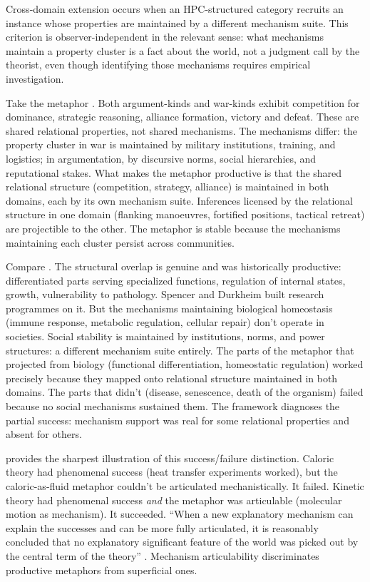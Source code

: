 \documentclass[12pt]{article}
\begin{document}
Cross-domain extension occurs when an HPC-structured category recruits an instance whose properties are maintained by a different mechanism suite. This criterion is observer-independent in the relevant sense: what mechanisms maintain a property cluster is a fact about the world, not a judgment call by the theorist, even though identifying those mechanisms requires empirical investigation.

Take the metaphor . Both argument-kinds and war-kinds exhibit competition for dominance, strategic reasoning, alliance formation, victory and defeat. These are shared relational properties, not shared mechanisms. The mechanisms differ: the property cluster in war is maintained by military institutions, training, and logistics; in argumentation, by discursive norms, social hierarchies, and reputational stakes. What makes the metaphor productive is that the shared relational structure (competition, strategy, alliance) is maintained in both domains, each by its own mechanism suite. Inferences licensed by the relational structure in one domain (flanking manoeuvres, fortified positions, tactical retreat) are projectible to the other. The metaphor is stable because the mechanisms maintaining each cluster persist across communities.

Compare . The structural overlap is genuine and was historically productive: differentiated parts serving specialized functions, regulation of internal states, growth, vulnerability to pathology. Spencer and Durkheim built research programmes on it. But the mechanisms maintaining biological homeostasis (immune response, metabolic regulation, cellular repair) don't operate in societies. Social stability is maintained by institutions, norms, and power structures: a different mechanism suite entirely. The parts of the metaphor that projected from biology (functional differentiation, homeostatic regulation) worked precisely because they mapped onto relational structure maintained in both domains. The parts that didn't (disease, senescence, death of the organism) failed because no social mechanisms sustained them. The framework diagnoses the partial success: mechanism support was real for some relational properties and absent for others.

\textcite{cummiskey1992} provides the sharpest illustration of this success/failure distinction. Caloric theory had phenomenal success (heat transfer experiments worked), but the caloric-as-fluid metaphor couldn't be articulated mechanistically. It failed. Kinetic theory had phenomenal success \emph{and} the metaphor was articulable (molecular motion as mechanism). It succeeded. \enquote{When a new explanatory mechanism can explain the successes and can be more fully articulated, it is reasonably concluded that no explanatory significant feature of the world was picked out by the central term of the theory} \citep[35]{cummiskey1992}. Mechanism articulability discriminates productive metaphors from superficial ones.
\end{document}
